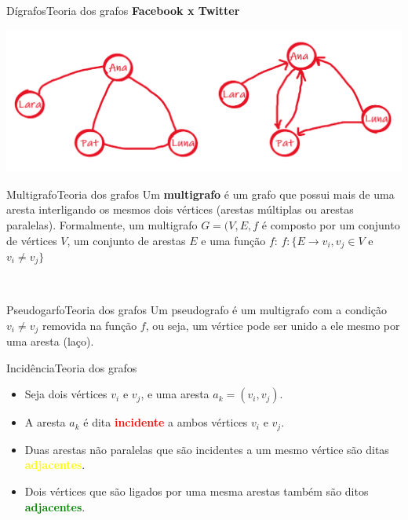 \documentclass[t]{beamer}
\begin{document}
\begin{ftst}{Dígrafos}{Teoria dos grafos}
\centering
\textbf{Facebook x Twitter}

\vone

\vone
\centering
\includegraphics[scale=0.5]{Figuras/facetwitter.png}\\

\end{ftst}



\begin{ftst}{Multigrafo}{Teoria dos grafos}
\justifying
Um \textbf{multigrafo} é um grafo que possui mais de uma aresta interligando os mesmos dois vértices (arestas múltiplas ou arestas paralelas). 
\vone
Formalmente, um multigrafo $G = (V,E,f$ é composto por um conjunto de vértices $V$, um conjunto de arestas $E$ e uma função $f$:
\vone
\centering
\huge
$f: \{E \rightarrow v_i, v_j \in V$ e $v_i \neq v_j \}$


\\


\end{ftst}


\begin{ftst}{Pseudogarfo}{Teoria dos grafos}
\justifying
Um pseudografo é um multigrafo com a condição $v_i \neq v_j$ removida na função $f$, ou seja, um vértice pode ser unido a ele mesmo por uma aresta (laço).
\vone
\vone
\centering
\\


\end{ftst}


\begin{ftst}{Incidência}{Teoria dos grafos}
\justifying
\begin{itemize}
    \item Seja dois vértices $v_i$ e $v_j$, e uma aresta $a_k = (v_i,v_j)$.
    \item A aresta $a_k$ é dita \textcolor{red}{\textbf{incidente}} a ambos vértices $v_i$ e $v_j$.
    \item Duas arestas não paralelas que são incidentes a um mesmo vértice são ditas \textcolor{yellow}{\textbf{adjacentes}}.
    \item Dois vértices que são ligados por uma mesma arestas também são ditos \textcolor{green}{\textbf{adjacentes}}. 
\end{itemize}
\vone
\vone
\centering
\\


\end{ftst}
\end{document}
